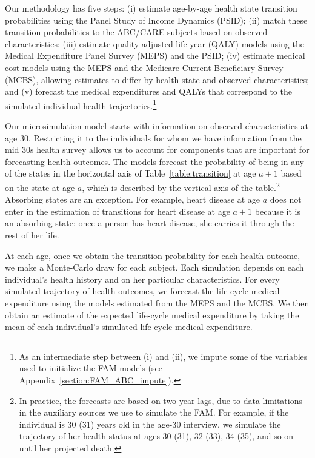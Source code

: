 Our methodology has five steps: (i) estimate age-by-age health state transition probabilities using the Panel Study of Income Dynamics (PSID); (ii) match these transition probabilities to the ABC/CARE subjects based on observed characteristics; (iii) estimate quality-adjusted life year (QALY) models using the Medical Expenditure Panel Survey (MEPS) and the PSID; (iv) estimate medical cost models using the MEPS and the Medicare Current Beneficiary Survey (MCBS), allowing estimates to differ by health state and observed characteristics; and (v) forecast the medical expenditures and QALYs that correspond to the simulated individual health trajectories.\footnote{As an intermediate step between (i) and (ii), we impute some of the variables used to initialize the FAM models (see  Appendix~\ref{section:FAM_ABC_impute}).}

Our microsimulation model starts with information on observed characteristics at age 30. Restricting it to the individuals for whom we have information from the mid 30s health survey allows us to account for components that are important for forecasting health outcomes. The models forecast the probability of being in any of the states in the horizontal axis of Table~\ref{table:transition} at age $a+1$ based on the state at age $a$, which is described by the vertical axis of the table.\footnote{In practice, the forecasts are based on two-year lags, due to data limitations in the auxiliary sources we use to simulate the FAM. For example, if the individual is 30 (31) years old in the age-30 interview, we simulate the trajectory of her health status at ages 30 (31), 32 (33), 34 (35), and so on until her projected death.} Absorbing states are an exception. For example, heart disease at age $a$ does not enter in the estimation of transitions for heart disease at age $a+1$ because it is an absorbing state: once a person has heart disease, she carries it through the rest of her life.

At each age, once we obtain the transition probability for each health outcome, we make a Monte-Carlo draw for each subject. Each simulation depends on each individual's health history and on her particular characteristics. For every simulated trajectory of health outcomes, we forecast the life-cycle medical expenditure using the models estimated from the MEPS and the MCBS. We then obtain an estimate of the expected life-cycle medical expenditure by taking the mean of each individual's simulated life-cycle medical expenditure.

